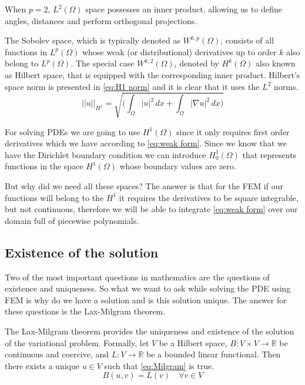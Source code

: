\documentclass[conference]{IEEEtran}
\begin{document}
When $p=2$, $L^{2}(\Omega)$ space possesses an inner product, allowing us to define angles, distances and perform orthogonal projections.

The Sobolev space, which is typically denoted as $W^{k, p}(\Omega)$, consists of all functions in $L^{p}(\Omega)$ whose weak (or distributional) derivatives up to order $k$ also belong to $L^{p}(\Omega)$. 
The special case $W^{k,2}(\Omega)$, denoted by $H^{k}(\Omega)$ also known as Hilbert space, that is equipped with the corresponding inner product. Hilbert's space norm is presented in \ref{eq:H1 norm} and it is clear that it uses the $L^2$ norms. 
\begin{equation}
    ||u||_{H^1} = \sqrt{\Bigg(\int_\Omega |u|^2 \, dx + \int_\Omega |\nabla u|^2 \, dx \Bigg)}
    \label{eq:H1 norm}
\end{equation}

For solving PDEs we are going to use $H^{1}(\Omega)$ since it only requires first order derivatives which we have according to \ref{eq:weak form}. 
Since we know that we have the Dirichlet boundary condition we can introduce $H_{0}^{1}(\Omega)$ that represents functions in the space $H^{1}(\Omega)$ whose boundary values are zero.

But why did we need all these spaces? The answer is that for the FEM if our functions will belong to the $H^1$ it requires the derivatives to be square integrable, but not continuous, therefore we will be able to integrate \ref{eq:weak form} over our domain full of piecewise polynomials. 


\subsection{Existence of the solution}
Two of the most important questions in mathematics are the questions of existence and uniqueness. So what we want to ask while solving the PDE using FEM is why do we have a solution and is this solution unique. The answer for these questions is the Lax-Milgram theorem.

The Lax-Milgram theorem provides the uniqueness and existence of the solution of the variational problem. Formally, let $V$ be a Hilbert space, $B: V \times V \rightarrow \mathbb{R}$ be continuous and coercive, and $L: V \rightarrow \mathbb{R}$ be a bounded linear functional. Then there exists a unique $u \in V$ such that \ref{eq:Milgram} is true.
\begin{equation}
    B(u, v) = L(v) \quad \forall v \in V
    \label{eq:Milgram}
\end{equation}
\end{document}
